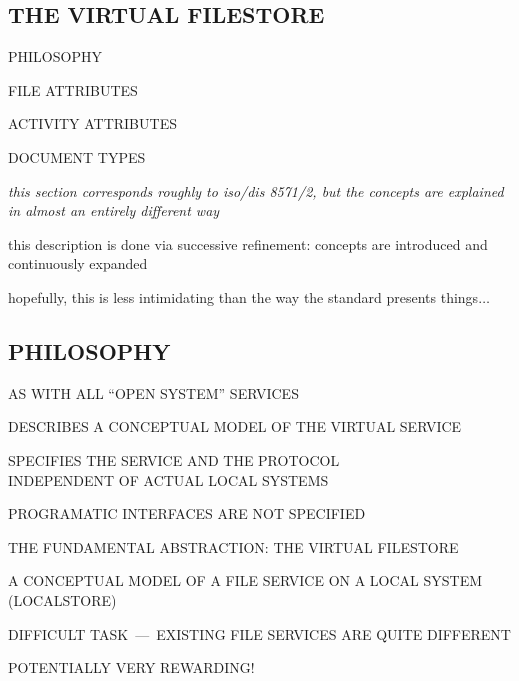 
\begin{bwslide}
\part	{THE VIRTUAL FILESTORE}

\begin{nrtc}\bf
\item	PHILOSOPHY

\item	FILE ATTRIBUTES

\item	ACTIVITY ATTRIBUTES

\item	DOCUMENT TYPES
\end{nrtc}
\end{bwslide}


\begin{note}\em
this section corresponds roughly to iso/dis 8571/2,
but the concepts are explained in almost an entirely different way

this description is done via successive refinement:
concepts are introduced and continuously expanded

hopefully,
this is less intimidating than the way the standard presents things$\ldots$
\end{note}


\begin{bwslide}
\part*	{PHILOSOPHY}\bf

\begin{nrtc}
\item	AS WITH ALL ``OPEN SYSTEM'' SERVICES
    \begin{nrtc}
    \item	DESCRIBES A CONCEPTUAL MODEL OF THE VIRTUAL SERVICE

    \item	SPECIFIES THE SERVICE AND THE PROTOCOL\\
		INDEPENDENT OF ACTUAL LOCAL SYSTEMS
	\begin{nrtc}
	\item	PROGRAMATIC INTERFACES ARE NOT SPECIFIED
	\end{nrtc}
    \end{nrtc}

\item	THE FUNDAMENTAL ABSTRACTION: THE VIRTUAL FILESTORE

\item	A CONCEPTUAL MODEL OF A FILE SERVICE ON A LOCAL SYSTEM (LOCALSTORE)

\item	DIFFICULT TASK~---~EXISTING FILE SERVICES ARE QUITE DIFFERENT

\item	POTENTIALLY VERY REWARDING!
\end{nrtc}
\end{bwslide}


